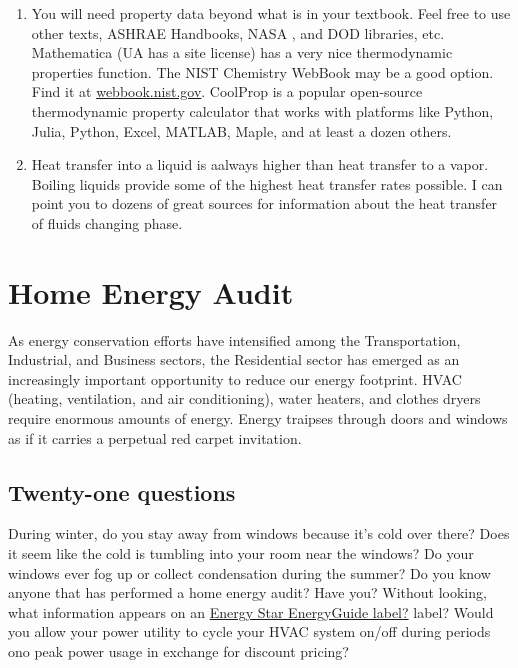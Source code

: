 \documentclass[]{tufte-book}
\begin{document}
\begin{enumerate}
\def\labelenumi{\arabic{enumi}.}
\item
  You will need property data beyond what is in your textbook. Feel free to use other texts, ASHRAE Handbooks, NASA \citep{mcbride_nasa_2002}, \citep{noauthor_nasa_nodate} and DOD \citep{noauthor_defense_nodate} libraries, etc. Mathematica (UA has a site license) has a very nice thermodynamic properties function. The NIST \citep{linstrom_nist_2019} Chemistry WebBook may be a good option. Find it at \url{webbook.nist.gov}. CoolProp \citep{bell_pure_2014} is a popular open-source thermodynamic property calculator that works with platforms like Python, Julia, Python, Excel, MATLAB, Maple, and at least a dozen others.
\item
  Heat transfer into a liquid is aalways higher than heat transfer to a vapor. Boiling liquids provide some of the highest heat transfer rates possible. I can point you to dozens of great sources for information about the heat transfer of fluids changing phase.
\end{enumerate}

\hypertarget{home-energy-audit}{%
\chapter{Home Energy Audit}\label{home-energy-audit}}

As energy conservation efforts have intensified among the Transportation, Industrial, and Business sectors, the Residential sector has emerged as an increasingly important opportunity to reduce our energy footprint. HVAC (heating, ventilation, and air conditioning), water heaters, and clothes dryers require enormous amounts of energy. Energy traipses through doors and windows as if it carries a perpetual red carpet invitation.

\hypertarget{twenty-one-questions}{%
\section{Twenty-one questions}\label{twenty-one-questions}}

During winter, do you stay away from windows because it's cold over there? Does it seem like the cold is tumbling into your room near the windows? Do your windows ever fog up or collect condensation during the summer? Do you know anyone that has performed a home energy audit? Have you? Without looking, what information appears on an \href{https://www.snopud.com/site/content/images/ee/eguidelabel.jpg}{Energy Star EnergyGuide label?} label? Would you allow your power utility to cycle your HVAC system on/off during periods ono peak power usage in exchange for discount pricing?
\end{document}

